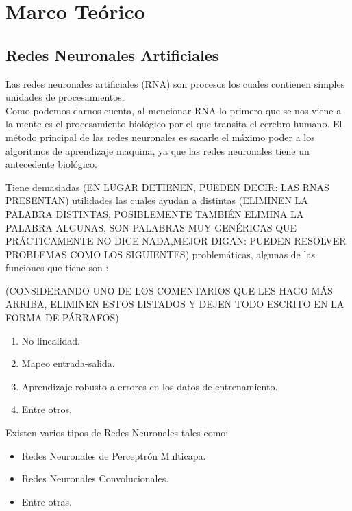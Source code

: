 \section{Marco Teórico}

    
    
    \subsection{Redes Neuronales Artificiales}
        
        Las redes neuronales artificiales (RNA) son procesos los cuales contienen simples unidades de procesamientos. \\
        Como podemos darnos cuenta, al mencionar RNA lo primero que se nos viene a la mente es el procesamiento biol\'ogico por el que transita el 
        cerebro humano. El m\'etodo principal de las redes neuronales es sacarle el máximo poder a los algoritmos de aprendizaje maquina, ya que las redes neuronales 
        tiene un antecedente biol\'ogico.

        Tiene demasiadas (EN LUGAR DETIENEN, PUEDEN DECIR: LAS RNAS PRESENTAN) utilidades las cuales ayudan a distintas (ELIMINEN LA PALABRA DISTINTAS, POSIBLEMENTE TAMBIÉN ELIMINA LA PALABRA ALGUNAS, SON PALABRAS MUY GENÉRICAS QUE PRÁCTICAMENTE NO DICE NADA,MEJOR DIGAN: PUEDEN RESOLVER PROBLEMAS COMO LOS SIGUIENTES) problemáticas, algunas de las funciones que tiene son \cite{liu2015}:

(CONSIDERANDO UNO DE LOS COMENTARIOS QUE LES HAGO MÁS ARRIBA, ELIMINEN ESTOS LISTADOS Y DEJEN TODO ESCRITO EN LA FORMA DE PÁRRAFOS)
        \begin{enumerate}
            \item No linealidad.
            \item Mapeo entrada-salida.
            \item Aprendizaje robusto a errores en los datos de entrenamiento. 
            \item Entre otros.
        \end{enumerate}

        Existen varios tipos de Redes Neuronales tales como: 
        \begin{itemize}
            \item Redes Neuronales de Perceptr\'on Multicapa.
            \item Redes Neuronales Convolucionales.
            \item Entre otras.
        \end{itemize}
    
